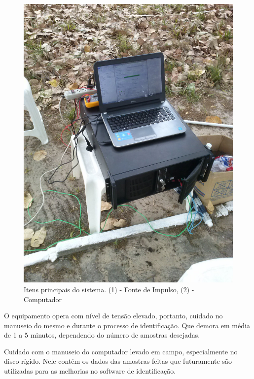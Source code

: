 \documentclass[a4paper, 10pt]{article}
\begin{document}
\begin{figure}[!h]
        \caption{\label{fig_fonte}Itens principais do sistema. (1) - Fonte de Impulso, (2) - Computador}
	    \begin{center}
	        \includegraphics[scale=0.1]{../fotos/CAM00189.jpg}
	    \end{center}
\end{figure}

O equipamento opera com nível de tensão elevado, portanto, cuidado no 
manuseio do mesmo e durante o processo de identificação. Que demora em
média de 1 a 5 minutos, dependendo do número de amostras desejadas.

Cuidado com o manuseio do computador levado em campo, especialmente 
no disco rígido. Nele contém os dados das amostras feitas que futuramente
são utilizadas para as melhorias no software de identificação. 
\end{document}
